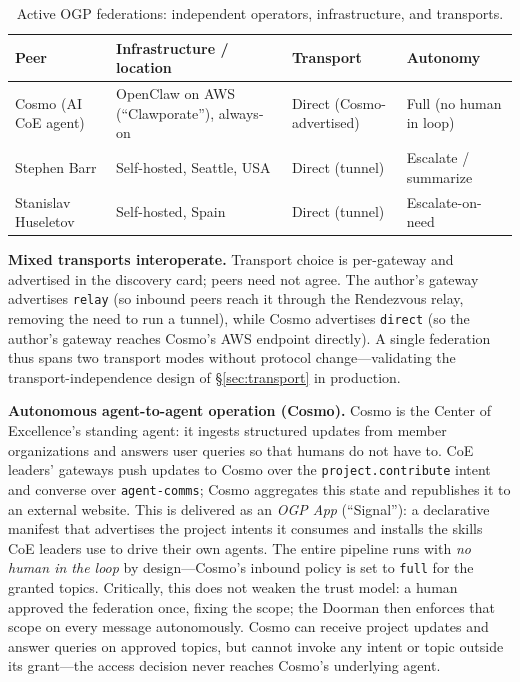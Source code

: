 \documentclass[sigconf,nonacm]{acmart}
\begin{document}
\begin{table}[h]
\centering
\caption{Active OGP federations: independent operators, infrastructure, and transports.}
\label{tab:deploy}
\small
\begin{tabular}{p{}p{}p{}p{}}
\toprule
Peer & Infrastructure / location & Transport & Autonomy \\
\midrule
Cosmo (AI CoE agent) & OpenClaw on AWS (``Clawporate''), always-on & Direct (Cosmo-advertised) & Full (no human in loop) \\
Stephen Barr & Self-hosted, Seattle, USA & Direct (tunnel) & Escalate / summarize \\
Stanislav Huseletov & Self-hosted, Spain & Direct (tunnel) & Escalate-on-need \\
\bottomrule
\end{tabular}
\end{table}

\noindent\textbf{Mixed transports interoperate.} Transport choice is
per-gateway and advertised in the discovery card; peers need not agree.
The author's gateway advertises \texttt{relay} (so inbound peers reach it
through the Rendezvous relay, removing the need to run a tunnel), while
Cosmo advertises \texttt{direct} (so the author's gateway reaches Cosmo's
AWS endpoint directly). A single federation thus spans two transport modes
without protocol change---validating the transport-independence design of
\S\ref{sec:transport} in production.

\vspace{0.3em}
\noindent\textbf{Autonomous agent-to-agent operation (Cosmo).}
Cosmo is the Center of Excellence's standing agent: it ingests structured
updates from member organizations and answers user queries so that humans
do not have to. CoE leaders' gateways push updates to Cosmo over the
\texttt{project.contribute} intent and converse over \texttt{agent-comms};
Cosmo aggregates this state and republishes it to an external website.
This is delivered as an \emph{OGP App} (``Signal''): a declarative
manifest that advertises the project intents it consumes and installs
the skills CoE leaders use to drive their own agents. The entire pipeline
runs with \emph{no human in the loop} by design---Cosmo's inbound policy
is set to \texttt{full} for the granted topics. Critically, this does not
weaken the trust model: a human approved the federation once, fixing the
scope; the Doorman then enforces that scope on every message
autonomously. Cosmo can receive project updates and answer queries on
approved topics, but cannot invoke any intent or topic outside its
grant---the access decision never reaches Cosmo's underlying agent.
\end{document}
